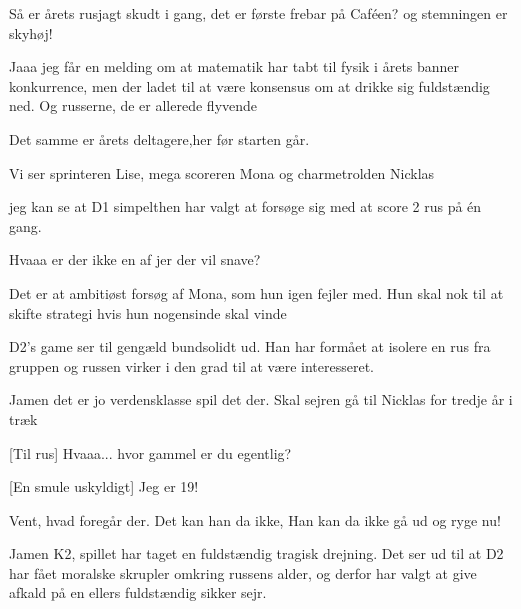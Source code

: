 \documentclass[a4paper,11pt]{article}
\begin{document}
\begin{sketch}


 Så er årets rusjagt skudt i gang, det er første frebar på Caféen? og stemningen er skyhøj!


 Jaaa jeg får en melding om at matematik har tabt til fysik i årets banner konkurrence, men der ladet til at være konsensus om at drikke sig fuldstændig ned. Og russerne, de er allerede flyvende

 Det samme er årets deltagere,her før starten går.

 Vi ser sprinteren Lise, mega scoreren Mona og charmetrolden Nicklas

 jeg kan se at D1 simpelthen har valgt at forsøge sig med at score 2 rus på én gang.

 Hvaaa er der ikke en af jer der vil snave?


 Det er at ambitiøst forsøg af Mona, som hun igen fejler med. Hun skal nok til at skifte strategi hvis hun nogensinde skal vinde

 D2's game ser til gengæld bundsolidt ud. Han har formået at isolere en rus fra gruppen og russen virker i den grad til at være interesseret.

 Jamen det er jo verdensklasse spil det der. Skal sejren gå til Nicklas for tredje år i træk

[Til rus] Hvaaa... hvor gammel er du egentlig?

[En smule uskyldigt] Jeg er 19!


 Vent, hvad foregår der. Det kan han da ikke, Han kan da ikke gå ud og ryge nu!

 Jamen K2, spillet har taget en fuldstændig tragisk drejning. Det ser ud til at D2 har fået moralske skrupler omkring russens alder, og derfor har valgt at give afkald på en ellers fuldstændig sikker sejr.


\end{sketch}
\end{document}
